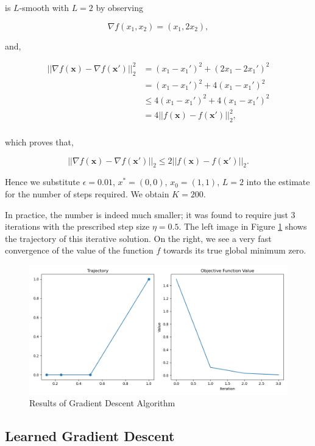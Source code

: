 \documentclass[12pt]{article}
\begin{document}
is $L$-smooth with $L=2$ by observing

\[\nabla f(x_1, x_2) = (x_1, 2x_2),\]

and,

\begin{align*}
    ||\nabla f(\bm{x}) - \nabla f(\bm{x}')||_2^2 & = (x_1-x_1')^2 + (2x_1-2x_1')^2 \\
                                            & = (x_1-x_1')^2 + 4(x_1-x_1')^2 \\
                                            & \leq 4(x_1-x_1')^2 + 4(x_1-x_1')^2 \\
                                            & = 4||f(\bm{x}) - f(\bm{x}')||_2^2, \\
\end{align*}

which proves that,

\[
    ||\nabla f(\bm{x}) - \nabla f(\bm{x}')||_2 \leq 2||f(\bm{x}) - f(\bm{x}')||_2.
\]

Hence we substitute $\epsilon=0.01$, $x^*=(0,0)$, $x_0=(1,1)$, $L=2$ into the estimate for the number of steps required.
We obtain $K=200$.

In practice, the number is indeed much smaller; it was found to require just 3 iterations with the prescribed step size $\eta=0.5$.
The left image in Figure \ref{fig:gradient_descent} shows the trajectory of this iterative solution.
On the right, we see a very fast convergence of the value of the function $f$ towards its true global minimum zero.

\begin{figure}[htp]
    \includegraphics[scale=0.5, center]{figures/gradient_descent.png}
    \caption{Results of Gradient Descent Algorithm}
    \label{fig:gradient_descent}
\end{figure}

\subsection{Learned Gradient Descent}
\end{document}

